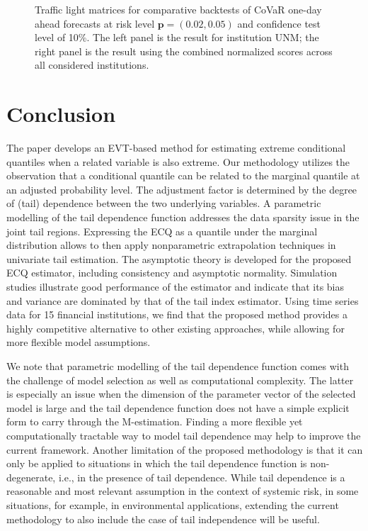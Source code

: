 \documentclass[11pt,letterpaper]{article}
\def\pb{{\mathbf p}}
\numberwithin{equation}{section}
\begin{document}
\begin{figure}[H] 
\centering
{}
\caption{Traffic light matrices for comparative backtests of CoVaR one-day ahead forecasts at risk level $\pb = (0.02,0.05)$ and confidence test level of 10\%. The left panel is the result for institution UNM; the right panel is the result using the combined normalized scores across all considered institutions.}
\label{figTLM}
\end{figure}

\section{Conclusion}\label{sconc}
The paper develops an EVT-based method for estimating extreme conditional quantiles when a related variable is also extreme. Our methodology utilizes the observation that a conditional quantile can be related to the marginal quantile at an adjusted probability level. The adjustment factor is determined by the degree of (tail) dependence between the two underlying variables. A parametric modelling of the tail dependence function addresses the data sparsity issue in the joint tail regions. Expressing the ECQ as a quantile under the marginal distribution allows to then apply nonparametric extrapolation techniques in univariate tail estimation. The asymptotic theory is developed for the proposed ECQ estimator, including consistency and asymptotic normality.  Simulation studies illustrate good performance of the estimator and indicate that its bias and variance are dominated by that of the tail index estimator. Using time series data for 15 financial institutions, we find that the proposed method provides a highly competitive alternative to other existing approaches, while allowing for more flexible model assumptions.

We note that parametric modelling of the tail dependence function comes with the challenge of model selection as well as computational complexity. The latter is especially an issue when the dimension of the parameter vector of the selected model is large and the tail dependence function does not have a simple explicit form to carry through the M-estimation. Finding a more flexible yet computationally tractable way to model tail dependence may help to improve the current framework. Another limitation of the proposed methodology is that it can only be applied to situations in which the tail dependence function is non-degenerate, i.e., in the presence of tail dependence. While tail dependence is a reasonable and most relevant assumption in the context of systemic risk, in some situations, for example, in environmental applications, extending the current methodology to also include the case of tail independence will be useful. 
\end{document}
